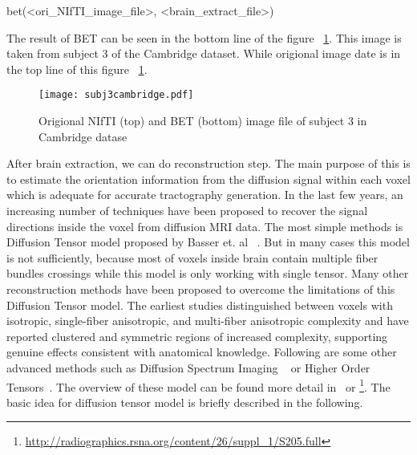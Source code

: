 \begin{python}
 bet(<ori_NIfTI_image_file>, <brain_extract_file>)
\end{python}

The result of BET can be seen in the bottom line of the figure ~\ref{Fig:subj3}. This image is taken from subject 3 of the Cambridge dataset. While origional image date is in the top line of this figure ~\ref{Fig:subj3}.

\begin{figure} 
  \centering 
  \texttt{[image: subj3cambridge.pdf]}   %
  \caption{Origional NIfTI (top) and BET (bottom) image file of subject 3 in Cambridge datase}
  \label{Fig:subj3}
\end{figure}


After brain extraction, we can do reconstruction step. The main purpose of this is to estimate the orientation information from the diffusion signal within each voxel which is adequate for accurate tractography generation. In the last few years, an increasing number of techniques have been proposed to recover the signal directions inside the voxel from diffusion MRI data. The most simple methods is Diffusion Tensor model proposed by Basser et. al
~\cite{basser1994diffusion}. But in many cases this model is not sufficiently, because most of voxels inside brain contain multiple fiber bundles crossings while this model is only working with single tensor. Many other reconstruction methods have been proposed to overcome the limitations of this Diffusion Tensor model. The earliest studies distinguished between voxels with isotropic, single-fiber anisotropic, and multi-fiber anisotropic complexity and have reported clustered and symmetric regions of increased complexity, supporting genuine effects consistent with anatomical knowledge. Following are some other advanced methods such as Diffusion Spectrum Imaging ~\cite{callaghan1988microscopy} or Higher Order Tensors~\cite{ozarslan2005diffusion}. The overview of these model can be found more detail in~\cite{hagmann2006diffusion} or \footnote{\url{http://radiographics.rsna.org/content/26/suppl_1/S205.full}}. The basic idea for diffusion tensor model is briefly described in the following.

